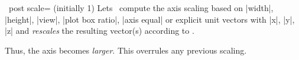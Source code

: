 \begin{pgfplotsxykeylist}{\x\ post scale= (initially 1)}
	Lets \PGFPlots\ compute the axis scaling based on |width|, |height|, |view|, |plot box ratio|, |axis equal| or explicit unit vectors with |x|, |y|, |z| and \emph{rescales} the resulting vector(s) according to .
\begin{codeexample}[]
\end{codeexample}
	Thus, the axis becomes \emph{larger}. This overrules any previous scaling.

\begin{codeexample}[]
\end{codeexample}
\end{pgfplotsxykeylist}
